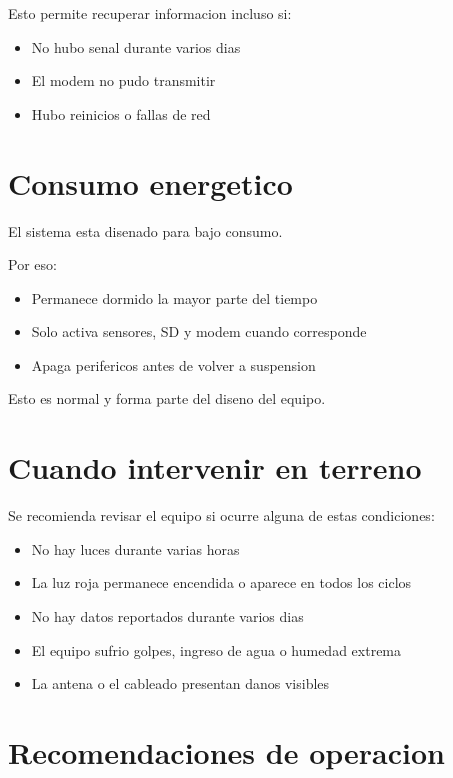 \documentclass[11pt,a4paper]{article}
\begin{document}
Esto permite recuperar informacion incluso si:

\begin{itemize}
  \item No hubo senal durante varios dias
  \item El modem no pudo transmitir
  \item Hubo reinicios o fallas de red
\end{itemize}

\section{Consumo energetico}

El sistema esta disenado para bajo consumo.

Por eso:

\begin{itemize}
  \item Permanece dormido la mayor parte del tiempo
  \item Solo activa sensores, SD y modem cuando corresponde
  \item Apaga perifericos antes de volver a suspension
\end{itemize}

Esto es normal y forma parte del diseno del equipo.

\section{Cuando intervenir en terreno}

Se recomienda revisar el equipo si ocurre alguna de estas condiciones:

\begin{itemize}
  \item No hay luces durante varias horas
  \item La luz roja permanece encendida o aparece en todos los ciclos
  \item No hay datos reportados durante varios dias
  \item El equipo sufrio golpes, ingreso de agua o humedad extrema
  \item La antena o el cableado presentan danos visibles
\end{itemize}

\section{Recomendaciones de operacion}
\end{document}
